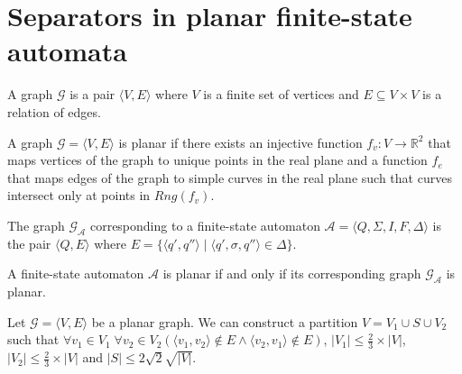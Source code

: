 \section{Separators in planar finite-state automata}

\begin{definition}
	A graph $\mathcal{G}$ is a pair $\langle V, E \rangle$ where $V$ is a
	finite set of vertices and $E \subseteq V \times V$ is a relation of edges.
\end{definition}

\begin{definition}
	A graph $\mathcal{G} = \langle V, E \rangle$ is planar if there exists an
	injective function $f_v : V \rightarrow \mathbb{R}^2$ that maps vertices of
	the graph to unique points in the real plane and a function $f_e$ that maps
	edges of the graph to simple curves in the real plane such that curves
	intersect only at points in $Rng(f_v)$.
\end{definition}

\begin{definition}
	The graph $\mathcal{G}_{\mathcal{A}}$ corresponding to a finite-state
	automaton $\mathcal{A} = \langle Q, \Sigma, I, F, \Delta \rangle$ is the
	pair $\langle Q, E \rangle$ where $E = \{ \langle q', q'' \rangle \mid
	\langle q', \sigma, q'' \rangle \in \Delta \}$.
\end{definition}

\begin{definition}
	A finite-state automaton $\mathcal{A}$ is planar if and only if its
	corresponding graph $\mathcal{G}_{\mathcal{A}}$ is planar.
\end{definition}

\begin{theorem}
	Let $\mathcal{G} = \langle V, E \rangle$ be a planar graph. We can
	construct a partition $V = V_1 \cup S \cup V_2$ such that
	$\forall v_1 \in V_1\; \forall v_2 \in V_2(\langle v_1, v_2 \rangle
	\not\in E \land \langle v_2, v_1 \rangle \not\in E)$, $\lvert V_1 \rvert
	\leq \frac{2}{3} \times \lvert V \rvert$, $\lvert V_2 \rvert \leq
	\frac{2}{3} \times \lvert V \rvert$ and $\lvert S \rvert \leq 2 \sqrt{2}
	\sqrt{\vert V \rvert}$.
\end{theorem}
